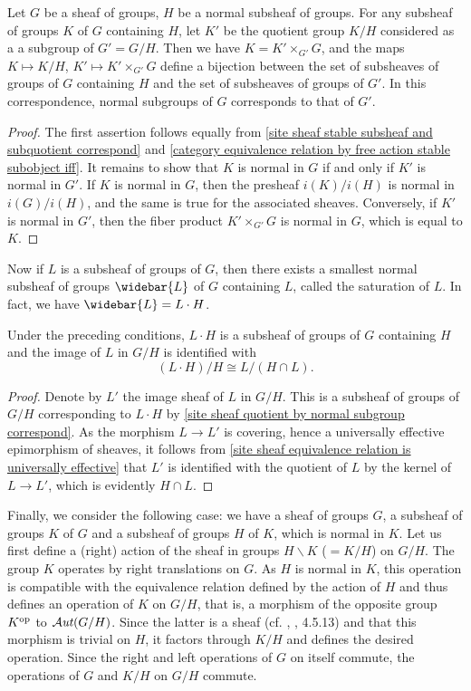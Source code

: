 \begin{proposition}\label{site sheaf quotient by normal subgroup correspond}
Let $G$ be a sheaf of groups, $H$ be a normal subsheaf of groups. For any subsheaf of groups $K$ of $G$ containing $H$, let $K'$ be the quotient group $K/H$ considered as a a subgroup of $G'=G/H$. Then we have $K=K'\times_{G'}G$, and the maps $K\mapsto K/H$, $K'\mapsto K'\times_{G'}G$ define a bijection between the set of subsheaves of groups of $G$ containing $H$ and the set of subsheaves of groups of $G'$. In this correspondence, normal subgroups of $G$ corresponds to that of $G'$.
\end{proposition}
\begin{proof}
The first assertion follows equally from \cref{site sheaf stable subsheaf and subquotient correspond} and \cref{category equivalence relation by free action stable subobject iff}. It remains to show that $K$ is normal in $G$ if and only if $K'$ is normal in $G'$. If $K$ is normal in $G$, then the presheaf $i(K)/i(H)$ is normal in $i(G)/i(H)$, and the same is true for the associated sheaves. Conversely, if $K'$ is normal in $G'$, then the fiber product $K'\times_{G'}G$ is normal in $G$, which is equal to $K$.
\end{proof}
Now if $L$ is a subsheaf of groups of $G$, then there exists a smallest normal subsheaf of groups $\widebar{L}$ of $G$ containing $L$, called the saturation of $L$. In fact, we have $\widebar{L}=L\cdot H$.

\begin{proposition}\label{site sheaf quotient by normal subgroup second isomorphism}
Under the preceding conditions, $L\cdot H$ is a subsheaf of groups of $G$ containing $H$ and the image of $L$ in $G/H$ is identified with
\[(L\cdot H)/H\cong L/(H\cap L).\]
\end{proposition}
\begin{proof}
Denote by $L'$ the image sheaf of $L$ in $G/H$. This is a subsheaf of groups of $G/H$ corresponding to $L\cdot H$ by \cref{site sheaf quotient by normal subgroup correspond}. As the morphism $L\to L'$ is covering, hence a universally effective epimorphism of sheaves, it follows from \cref{site sheaf equivalence relation is universally effective} that $L'$ is identified with the quotient of $L$ by the kernel of $L\to L'$, which is evidently $H\cap L$.
\end{proof}

Finally, we consider the following case: we have a sheaf of groups $G$, a subsheaf of groups $K$ of $G$ and a subsheaf of groups $H$ of $K$, which is normal in $K$. Let us first define a (right) action of the sheaf in groups $H\backslash K$ ($=K/H$) on $G/H$. The group $K$ operates by right translations on $G$. As $H$ is normal in $K$, this operation is compatible with the equivalence relation defined by the action of $H$ and thus defines an operation of $K$ on $G/H$, that is, a morphism of the opposite group $K^{\mathrm{op}}$ to $\operatorname{\mathcal{A}\hspace*{-0.2pt}\textit{ut}\hspace{0.5pt}}(G/H)$. Since the latter is a sheaf (cf. \cite{SGA3}, , 4.5.13) and that this morphism is trivial on $H$, it factors through $K/H$ and defines the desired operation. Since the right and left operations of $G$ on itself commute, the operations of $G$ and $K/H$ on $G/H$ commute.

